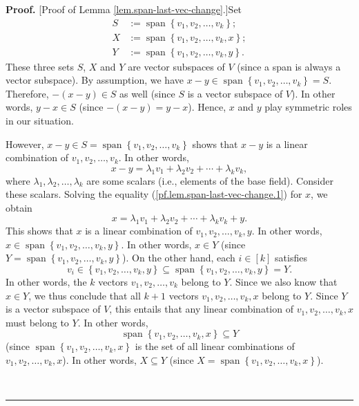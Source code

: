 \documentclass[numbers=enddot,12pt,final,onecolumn,notitlepage]{scrartcl}%
\numberwithin{exer}{subsection}
\theoremstyle{definition}
\newenvironment{proof}[1][Proof]{\noindent\textbf{#1.} }{\ \rule{0.5em}{0.5em}}
\begin{document}
\begin{proof}
[Proof of Lemma \ref{lem.span-last-vec-change}.]Set%
\begin{align*}
S  &  :=\operatorname*{span}\left\{  v_{1},v_{2},\ldots,v_{k}\right\}  ;\\
X  &  :=\operatorname*{span}\left\{  v_{1},v_{2},\ldots,v_{k},x\right\}  ;\\
Y  &  :=\operatorname*{span}\left\{  v_{1},v_{2},\ldots,v_{k},y\right\}  .
\end{align*}
These three sets $S$, $X$ and $Y$ are vector subspaces of $V$ (since a span is
always a vector subspace). By assumption, we have $x-y\in\operatorname*{span}%
\left\{  v_{1},v_{2},\ldots,v_{k}\right\}  =S$. Therefore, $-\left(
x-y\right)  \in S$ as well (since $S$ is a vector subspace of $V$). In other
words, $y-x\in S$ (since $-\left(  x-y\right)  =y-x$). Hence, $x$ and $y$ play
symmetric roles in our situation.

However, $x-y\in S=\operatorname*{span}\left\{  v_{1},v_{2},\ldots
,v_{k}\right\}  $ shows that $x-y$ is a linear combination of $v_{1}%
,v_{2},\ldots,v_{k}$. In other words,%
\begin{equation}
x-y=\lambda_{1}v_{1}+\lambda_{2}v_{2}+\cdots+\lambda_{k}v_{k},
\label{pf.lem.span-last-vec-change.1}%
\end{equation}
where $\lambda_{1},\lambda_{2},\ldots,\lambda_{k}$ are some scalars (i.e.,
elements of the base field). Consider these scalars. Solving the equality
(\ref{pf.lem.span-last-vec-change.1}) for $x$, we obtain%
\[
x=\lambda_{1}v_{1}+\lambda_{2}v_{2}+\cdots+\lambda_{k}v_{k}+y.
\]
This shows that $x$ is a linear combination of $v_{1},v_{2},\ldots,v_{k},y$.
In other words, $x\in\operatorname*{span}\left\{  v_{1},v_{2},\ldots
,v_{k},y\right\}  $. In other words, $x\in Y$ (since $Y=\operatorname*{span}%
\left\{  v_{1},v_{2},\ldots,v_{k},y\right\}  $). On the other hand, each
$i\in\left[  k\right]  $ satisfies%
\[
v_{i}\in\left\{  v_{1},v_{2},\ldots,v_{k},y\right\}  \subseteq
\operatorname*{span}\left\{  v_{1},v_{2},\ldots,v_{k},y\right\}  =Y.
\]
In other words, the $k$ vectors $v_{1},v_{2},\ldots,v_{k}$ belong to $Y$.
Since we also know that $x\in Y$, we thus conclude that all $k+1$ vectors
$v_{1},v_{2},\ldots,v_{k},x$ belong to $Y$. Since $Y$ is a vector subspace of
$V$, this entails that any linear combination of $v_{1},v_{2},\ldots,v_{k},x$
must belong to $Y$. In other words,%
\[
\operatorname*{span}\left\{  v_{1},v_{2},\ldots,v_{k},x\right\}  \subseteq Y
\]
(since $\operatorname*{span}\left\{  v_{1},v_{2},\ldots,v_{k},x\right\}  $ is
the set of all linear combinations of $v_{1},v_{2},\ldots,v_{k},x$). In other
words, $X\subseteq Y$ (since $X=\operatorname*{span}\left\{  v_{1}%
,v_{2},\ldots,v_{k},x\right\}  $).


\end{proof}
\end{document}
